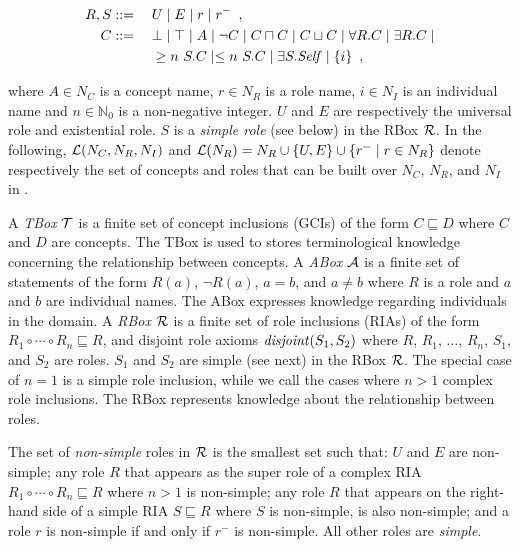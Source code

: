\documentclass[
]{ceurart}
\begin{document}
\begin{alignat*}{2}
  R, S &::={} && U \mid E \mid r \mid r^{-} \enspace,\\
  C &::= && \bot \mid \top \mid A \mid \neg C \mid C \sqcap C \mid C \sqcup C \mid \forall R.C \mid \exists R.C \mid \\ 
  &&& \geq n~S.C \mid \leq n~S.C \mid \exists S.\mathit{Self} \mid \{i\} \enspace,
\end{alignat*}

where $A \in N_C$ is a concept name, $r \in N_R$ is a role name, $i \in N_I$ is an individual name and $n \in \mathbb{N}_0$ is a non-negative integer. $U$ and $E$ are respectively the universal role and existential role. $S$ is a \emph{simple role} (see below) in the RBox $\mathcal{R}$. In the following, $\mathcal{L}(N_C, N_R, N_I)$ and $\mathcal{L}(N_R) = N_R \cup \{U, E\} \cup \{r^- \mid r \in N_R\}$ denote respectively the set of concepts and roles that can be built over $N_C$, $N_R$, and $N_I$ in \SROIQ.

A \emph{TBox} $\mathcal{T}$ is a finite set of concept inclusions (GCIs) of the form $C \sqsubseteq D$ where $C$ and $D$ are concepts. The TBox is used to stores terminological knowledge concerning the relationship between concepts. A \emph{ABox} $\mathcal{A}$ is a finite set of statements of the form $R(a)$, $\lnot R (a)$, $a = b$, and $a \not= b$ where $R$ is a role and $a$ and $b$ are individual names. The ABox expresses knowledge regarding individuals in the domain. A \emph{RBox} $\mathcal{R}$ is a finite set of role inclusions (RIAs) of the form $R_1 \circ \cdots \circ R_n \sqsubseteq R$, and disjoint role axioms $\mathit{disjoint}(S_1, S_2)$ where $R$, $R_1$, $\dots$, $R_n$, $S_1$, and $S_2$ are roles. $S_1$ and $S_2$ are simple (see next) in the RBox $\mathcal{R}$. The special case of $n = 1$ is a simple role inclusion, while we call the cases where $n > 1$ complex role inclusions. The RBox represents knowledge about the relationship between roles.

The set of \emph{non-simple} roles in $\mathcal{R}$ is the smallest set such that: $U$ and $E$ are non-simple; any role $R$ that appears as the super role of a complex RIA $R_1 \circ \cdots \circ R_n \sqsubseteq R$ where $n > 1$ is non-simple; any role $R$ that appears on the right-hand side of a simple RIA $S \sqsubseteq R$ where $S$ is non-simple, is also non-simple; and a role $r$ is non-simple if and only if $r^-$ is non-simple.
All other roles are \emph{simple}.
\end{document}
